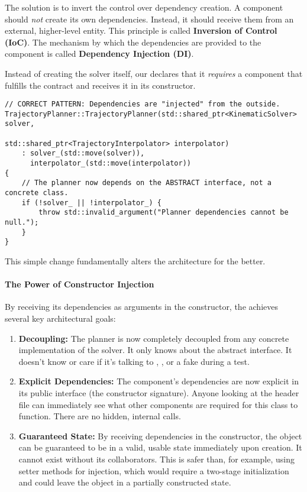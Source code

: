 The solution is to invert the control over dependency creation. A component should \textit{not} create its own dependencies. Instead, it should receive them from an external, higher-level entity. This principle is called \textbf{Inversion of Control (IoC)}. The mechanism by which the dependencies are provided to the component is called \textbf{Dependency Injection (DI)}.

Instead of creating the solver itself, our  declares that it \textit{requires} a component that fulfills the  contract and receives it in its constructor.

\begin{verbatim}
// CORRECT PATTERN: Dependencies are "injected" from the outside.
TrajectoryPlanner::TrajectoryPlanner(std::shared_ptr<KinematicSolver> solver,
                                     std::shared_ptr<TrajectoryInterpolator> interpolator)
    : solver_(std::move(solver)),
      interpolator_(std::move(interpolator))
{
    // The planner now depends on the ABSTRACT interface, not a concrete class.
    if (!solver_ || !interpolator_) {
        throw std::invalid_argument("Planner dependencies cannot be null.");
    }
}
\end{verbatim}
\label{lst:constructor-injection}

This simple change fundamentally alters the architecture for the better.

\paragraph{The Power of Constructor Injection}
By receiving its dependencies as arguments in the constructor, the  achieves several key architectural goals:
\begin{enumerate}
    \item \textbf{Decoupling:} The planner is now completely decoupled from any concrete implementation of the solver. It only knows about the abstract  interface. It doesn't know or care if it's talking to , , or a fake  during a test.
    \item \textbf{Explicit Dependencies:} The component's dependencies are now explicit in its public interface (the constructor signature). Anyone looking at the header file can immediately see what other components are required for this class to function. There are no hidden, internal  calls.
    \item \textbf{Guaranteed State:} By receiving dependencies in the constructor, the object can be guaranteed to be in a valid, usable state immediately upon creation. It cannot exist without its collaborators. This is safer than, for example, using setter methods for injection, which would require a two-stage initialization and could leave the object in a partially constructed state.
\end{enumerate}

